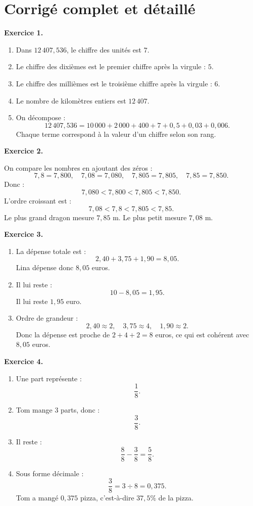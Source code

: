 \documentclass[11pt,a4paper]{article}
\newcommand{\corrige}[2]{
\begin{corrigebox}
\textbf{Exercice #1.}

#2
\end{corrigebox}
}
\begin{document}
\newpage

\section{Corrigé complet et détaillé}

\corrige{1}{
\begin{enumerate}[label=\arabic*)]
\item Dans $12\,407,536$, le chiffre des unités est $7$.
\item Le chiffre des dixièmes est le premier chiffre après la virgule : $5$.
\item Le chiffre des millièmes est le troisième chiffre après la virgule : $6$.
\item Le nombre de kilomètres entiers est $12\,407$.
\item On décompose :
\[
12\,407,536=10\,000+2\,000+400+7+0,5+0,03+0,006.
\]
Chaque terme correspond à la valeur d'un chiffre selon son rang.
\end{enumerate}
}

\corrige{2}{
On compare les nombres en ajoutant des zéros :
\[
7,8=7,800,\quad 7,08=7,080,\quad 7,805=7,805,\quad 7,85=7,850.
\]
Donc :
\[
7,080<7,800<7,805<7,850.
\]
L'ordre croissant est :
\[
7,08<7,8<7,805<7,85.
\]
Le plus grand dragon mesure $7,85$ m.
Le plus petit mesure $7,08$ m.
}

\corrige{3}{
\begin{enumerate}[label=\arabic*)]
\item La dépense totale est :
\[
2,40+3,75+1,90=8,05.
\]
Lina dépense donc $8,05$ euros.
\item Il lui reste :
\[
10-8,05=1,95.
\]
Il lui reste $1,95$ euro.
\item Ordre de grandeur :
\[
2,40\approx 2,\quad 3,75\approx 4,\quad 1,90\approx 2.
\]
Donc la dépense est proche de $2+4+2=8$ euros, ce qui est cohérent avec $8,05$ euros.
\end{enumerate}
}

\corrige{4}{
\begin{enumerate}[label=\arabic*)]
\item Une part représente :
\[
\frac{1}{8}.
\]
\item Tom mange $3$ parts, donc :
\[
\frac{3}{8}.
\]
\item Il reste :
\[
\frac{8}{8}-\frac{3}{8}=\frac{5}{8}.
\]
\item Sous forme décimale :
\[
\frac{3}{8}=3\div 8=0,375.
\]
Tom a mangé $0,375$ pizza, c'est-à-dire $37,5\%$ de la pizza.
\end{enumerate}
}
\end{document}
